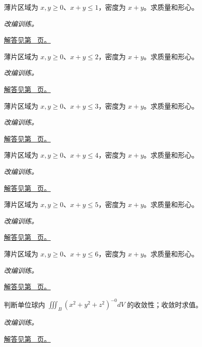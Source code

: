 \documentclass[UTF8,12pt,a4paper,fontset=fandol]{ctexart}
\begin{document}
\begin{example}[三角形中的非均匀密度]\label{ex:c40q7}
薄片区域为 $x,y\ge0$、$x+y\le 1$，密度为 $x+y$。求质量和形心。
\par\textit{改编训练。}\par\hyperref[ans:c40q7]{解答见第~\pageref{ans:c40q7} 页。}
\end{example}
\begin{example}[三角形中的非均匀密度]\label{ex:c40q8}
薄片区域为 $x,y\ge0$、$x+y\le 2$，密度为 $x+y$。求质量和形心。
\par\textit{改编训练。}\par\hyperref[ans:c40q8]{解答见第~\pageref{ans:c40q8} 页。}
\end{example}
\begin{example}[三角形中的非均匀密度]\label{ex:c40q9}
薄片区域为 $x,y\ge0$、$x+y\le 3$，密度为 $x+y$。求质量和形心。
\par\textit{改编训练。}\par\hyperref[ans:c40q9]{解答见第~\pageref{ans:c40q9} 页。}
\end{example}
\begin{example}[三角形中的非均匀密度]\label{ex:c40q10}
薄片区域为 $x,y\ge0$、$x+y\le 4$，密度为 $x+y$。求质量和形心。
\par\textit{改编训练。}\par\hyperref[ans:c40q10]{解答见第~\pageref{ans:c40q10} 页。}
\end{example}
\begin{example}[三角形中的非均匀密度]\label{ex:c40q11}
薄片区域为 $x,y\ge0$、$x+y\le 5$，密度为 $x+y$。求质量和形心。
\par\textit{改编训练。}\par\hyperref[ans:c40q11]{解答见第~\pageref{ans:c40q11} 页。}
\end{example}
\begin{example}[三角形中的非均匀密度]\label{ex:c40q12}
薄片区域为 $x,y\ge0$、$x+y\le 6$，密度为 $x+y$。求质量和形心。
\par\textit{改编训练。}\par\hyperref[ans:c40q12]{解答见第~\pageref{ans:c40q12} 页。}
\end{example}
\begin{example}[球心奇点的维数阈值]\label{ex:c40q13}
判断单位球内 $\displaystyle\iiint_B(x^2+y^2+z^2)^{-0}dV$ 的收敛性；收敛时求值。
\par\textit{改编训练。}\par\hyperref[ans:c40q13]{解答见第~\pageref{ans:c40q13} 页。}
\end{example}
\end{document}
